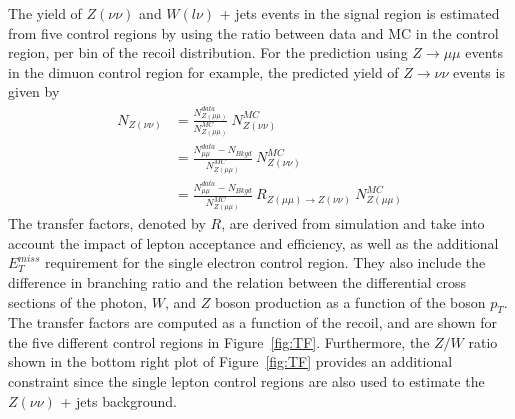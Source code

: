The yield of $Z(\nu\nu)$ and $W(l\nu)$ + jets events in the signal region is estimated from five control regions by using the ratio between data and MC in the control region, per bin of the recoil distribution. For the prediction using $Z\rightarrow \mu\mu$ events in the dimuon control region for example, the predicted yield of $Z\rightarrow\nu\nu$ events is given by
\begin{align}
 N_{Z(\nu\nu)} &= \frac{N_{Z(\mu\mu)}^{data}}{N_{Z(\mu\mu)}^{MC}}\ N_{Z(\nu\nu)}^{MC}\\
 &= \frac{N_{\mu\mu}^{data} - N_{Bkgd}}{N_{Z(\mu\mu)}^{MC}}\ N_{Z(\nu\nu)}^{MC} \\
 &= \frac{N_{\mu\mu}^{data} - N_{Bkgd}}{N_{Z(\mu\mu)}^{MC}}\ R_{Z(\mu\mu)\rightarrow Z(\nu\nu)}\ N_{Z(\mu\mu)}^{MC}
\end{align}
The transfer factors, denoted by $R$, are derived from simulation and take into account the impact of lepton acceptance and efficiency, as well as the additional $E_T^{miss}$ requirement for the single electron control region. They also include the difference in branching ratio and the relation between the differential cross sections of the photon, $W$, and $Z$ boson production as a function of the boson $p_T$. The transfer factors are computed as a function of the recoil, and are shown for the five different control regions in Figure~\ref{fig:TF}. Furthermore, the $Z/W$ ratio shown in the bottom right plot of Figure~\ref{fig:TF} provides an additional constraint since the single lepton control regions are also used to  estimate the $Z(\nu\nu)$ + jets background.

